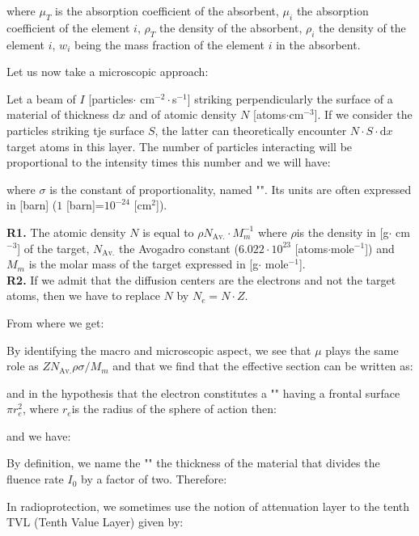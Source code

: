 	where $\mu_T$ is the absorption coefficient of the absorbent, $\mu_i$ the absorption coefficient of the element $i$, $\rho_T$ the density of the absorbent, $\rho_i$ the density of the element $i$, $w_i$ being the mass fraction of the element $i$ in the absorbent.

	Let us now take a microscopic approach:
	
	Let a beam of $I$ [particles$\cdot$ cm$^{-2}\cdot$s$^{-1}$] striking perpendicularly the surface of a material of thickness $\mathrm{d}x$ and of atomic density $N$ [atoms$\cdot$cm$^{-3}$]. If we consider the particles striking tje surface $S$, the latter can theoretically encounter $N\cdot S\cdot \mathrm{d}x$ target atoms in this layer. The number of particles interacting will be proportional to the intensity times this number and we will have:
	
	where $\sigma$ is the constant of proportionality, named "". Its units are often expressed in [barn] ($1$ [barn]=$10^{-24}$ [cm$^2$]). 
	\begin{tcolorbox}[title=Remark,colframe=black,arc=10pt]
	\textbf{R1.} The atomic density $N$ is equal to $\rho N_\text{Av.}\cdot M_m^{-1}$ where $\rho $is the density in [g$\cdot$ cm$^{-3}$] of the target, $N_\text{Av.}$ the Avogadro constant ($6.022\cdot 10^{23}$ [atoms$\cdot$mole$^{-1}$]) and $M_m$ is the molar mass of the target expressed in [g$\cdot$ mole$^{-1}$].\\

	\textbf{R2.} If we admit that the diffusion centers are the electrons and not the target atoms, then we have to replace $N$ by $N_e=N\cdot Z$.
	\end{tcolorbox}
	From where we get:
	
	By identifying the macro and microscopic aspect, we see that $\mu$ plays the same role as $ZN_\text{Av.}\rho\sigma/M_m$ and that we find that the effective section can be written as:
	
	and in the hypothesis that the electron constitutes a "" having a frontal surface $\pi r_e^2$, where $r_e$is the radius of the sphere of action then:
	
	and we have:
	
	By definition, we name the ""  the thickness of the material that divides the fluence rate $I_0$ by a factor of two. Therefore:
	
	In radioprotection, we sometimes use the notion of attenuation layer to the tenth TVL (Tenth Value Layer) given by:
	
